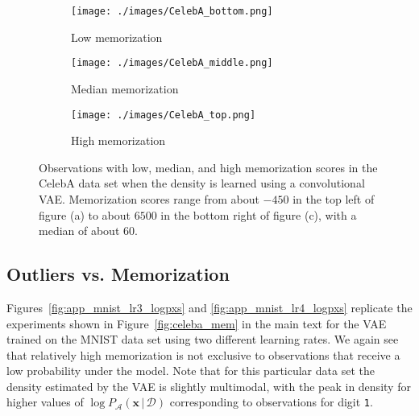 \documentclass{article}
\newcommand{\bft}[1]{\mathbf{#1}}
\newcommand{\given}{\,|\,}
\begin{document}
\begin{figure}[h]
	\centering
	\captionsetup[subfigure]{justification=centering}%
	\begin{subfigure}[b]{.30\textwidth}
		\texttt{[image: ./images/CelebA\_bottom.png]}
		\caption{Low memorization \label{fig:app_celeba_bottom}}
	\end{subfigure}
	\quad
	\begin{subfigure}[b]{.30\textwidth}
		\texttt{[image: ./images/CelebA\_middle.png]}
		\caption{Median memorization \label{fig:app_celeba_middle}}
	\end{subfigure}
	\quad
	\begin{subfigure}[b]{.30\textwidth}
		\texttt{[image: ./images/CelebA\_top.png]}
		\caption{High memorization \label{fig:app_celeba_top}}
	\end{subfigure}
	\caption{Observations with low, median, and high memorization scores 
		in the CelebA data set when the density is learned using a 
		convolutional VAE.  Memorization scores range from about 
		$-450$ in the top left of figure (a) to about $6500$ in the 
		bottom right of figure (c), with a median of about $60$.  
		\label{fig:app_celeba_mem}}
\end{figure}

\FloatBarrier
\clearpage
\subsection{Outliers vs. Memorization}%
\label{sub:outliers_vs_memorization}

Figures~\ref{fig:app_mnist_lr3_logpxs} and \ref{fig:app_mnist_lr4_logpxs} 
replicate the experiments shown in Figure~\ref{fig:celeba_mem} in the main 
text for the VAE trained on the MNIST data set using two different learning 
rates. We again see that relatively high memorization is not exclusive to 
observations that receive a low probability under the model. Note that for 
this particular data set the density estimated by the VAE is slightly 
multimodal, with the peak in density for higher values of $\log 
P_{\mathcal{A}}(\bft{x} \given \mathcal{D})$ corresponding to observations for 
digit \verb+1+.
\end{document}
